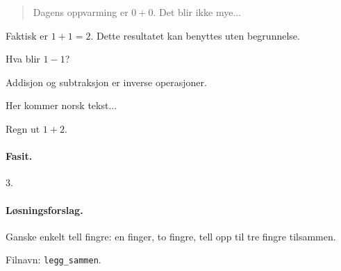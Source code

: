 \documentclass[%
norsk,oneside,                 %
final,                   %
10pt]{article}
\newcounter{doconce:movie:counter}
\newenvironment{notice_mdfboxadmon}[1][]{
\begin{notice_mdfboxmdframed}[frametitle=#1]
}
{
\end{notice_mdfboxmdframed}
}
\newenvironment{summary_mdfboxadmon}[1][]{
\begin{summary_mdfboxmdframed}[frametitle=#1]
}
{
\end{summary_mdfboxmdframed}
}
\newenvironment{question_mdfboxadmon}[1][]{
\begin{question_mdfboxmdframed}[frametitle=#1]
}
{
\end{question_mdfboxmdframed}
}
\newenvironment{doconceexercise}{}{}
\newcounter{doconceexercisecounter}
\begin{document}


\begin{quote}
Dagens oppvarming er $0 + 0$. Det blir ikke mye...
\end{quote}



\begin{notice_mdfboxadmon}[Observér.]
Faktisk er $1 + 1 = 2$. Dette resultatet kan benyttes uten begrunnelse.
\end{notice_mdfboxadmon} %




\begin{question_mdfboxadmon}[Spørsmål.]
Hva blir $1 - 1$?
\end{question_mdfboxadmon} %




\begin{summary_mdfboxadmon}[Sammendrag.]
Addisjon og subtraksjon er inverse operasjoner.
\end{summary_mdfboxadmon} %





\begin{notice_mdfboxadmon}
Her kommer norsk tekst...
\end{notice_mdfboxadmon} %



\begin{doconceexercise}

                             


Regn ut $1+2$.

\paragraph{Fasit.}
3.


\paragraph{Løsningsforslag.}
Ganske enkelt tell fingre: en finger, to fingre, tell opp til tre fingre
tilsammen.

\noindent Filnavn: \Verb!legg_sammen!.

\end{doconceexercise}
\end{document}

